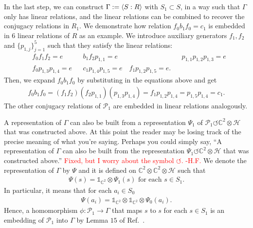 \documentclass[11pt,letterpaper]{article}
\newcommand{\x}{\otimes}
\DeclarePairedDelimiter{\ip}{\langle}{\rangle}
\newcommand{\C}{\mathbb{C}}
\newcommand{\calH}{\mathcal{H}}
\newcommand{\1}{\mathbb{1}}
\newcommand{\Pg}{\mathcal{P}}
\def\carl#1{{\color{blue} #1}}
\newcommand{\hfc}[1]{\textcolor{red}{#1 -H.F.}}
\theoremstyle{definition}
\begin{document}
In the last step, we can construct $\Gamma:= \ip{S:R}$ with $S_1 \subset S$, in a way such that
$\Gamma$ only has linear relations, and the linear relations can be combined
to recover the conjugacy relations in $R_1$.
We demonstrate how relation $f_0 b_1 f_0 = c_1$ is embedded in
$6$ linear relations of $R$ as an example. 
We introduce auxiliary generators $f_1, f_2$ and $\{p_{1,j}\}_{j=1}^5$ such that they satisfy the linear relations:
\begin{align*}
    &f_0 f_1 f_2 = e && b_1 f_2 p_{1,1} = e && p_{1,1} p_{1,2} p_{1,3} = e\\
	&f_0 p_{1,3} p_{1,4} = e && c_1 p_{1,4} p_{1,5} = e \quad f_1 p_{1,2} p_{1,5} = e.
\end{align*}
Then, we expand $f_0b_1f_0$ by substituting in the equations above and
get
\begin{align*}
    f_0b_1f_0 = (f_1f_2)(f_2p_{1,1})(p_{1,3}p_{1,4}) =
    f_1 p_{1,2}p_{1,4} = p_{1,5}p_{1,4} = c_1.
\end{align*}
The other conjugacy relations of $\Pg_1$ are embedded in linear relations analogously.

A representation of $\Gamma$ can also be built from
a representation $\Psi_1$ of $\Pg_1 \circlearrowleft \mathbb{C}^2 \otimes \mathcal{H}$
that was constructed above. \carl{At this point the reader may be losing track of the precise meaning of what you're saying.  Perhaps you could simply say, ``A representation of $\Gamma$ can also be built from the
representation $\Psi_1 \circlearrowleft \mathbb{C}^2 \otimes \mathcal{H}$ that was constructed above.''}
\hfc{Fixed, but I worry about the symbol $\circlearrowleft$.}
We denote the representation of $\Gamma$ by $\Psi$ and
it is defined on $\C^2 \x \C^2 \x \calH$ such that
\begin{align*}
    \Psi(s) = \1_{\C^2} \x \Psi_1(s) \text{ for each }
    s \in S_1.
\end{align*}
In particular, it means that for each $a_i \in S_0$
\begin{align*}
    \Psi(a_i) = \1_{\C^2} \x \1_{\C^2} \x \Psi_0(a_i).
\end{align*}
Hence, a homomorphism $\phi: \Pg_1 \rightarrow \Gamma$ that 
maps $s$ to $s$ for each $s \in S_1$ is an embedding of $\Pg_1$ into $\Gamma$
by Lemma $15$ of Ref.~\cite{slofstra2017}.


\end{document}
